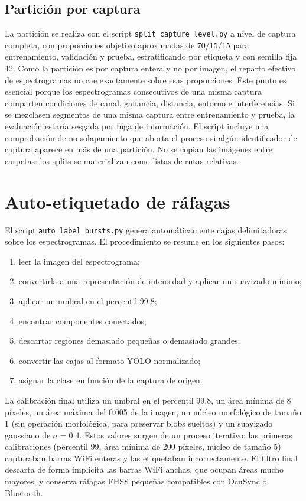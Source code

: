 \subsection{Partición por captura}

La partición se realiza con el script \texttt{split\_capture\_level.py} a nivel de captura completa, con proporciones objetivo aproximadas de \num{70}/\num{15}/\num{15} para entrenamiento, validación y prueba, estratificando por etiqueta y con semilla fija \num{42}. Como la partición es por captura entera y no por imagen, el reparto efectivo de espectrogramas no cae exactamente sobre esas proporciones. Este punto es esencial porque los espectrogramas consecutivos de una misma captura comparten condiciones de canal, ganancia, distancia, entorno e interferencias. Si se mezclasen segmentos de una misma captura entre entrenamiento y prueba, la evaluación estaría sesgada por fuga de información. El script incluye una comprobación de no solapamiento que aborta el proceso si algún identificador de captura aparece en más de una partición. No se copian las imágenes entre carpetas: los splits se materializan como listas de rutas relativas.

\section{Auto-etiquetado de ráfagas}
\label{sec:autoetiquetado}

El script \texttt{auto\_label\_bursts.py} genera automáticamente cajas delimitadoras sobre los espectrogramas. El procedimiento se resume en los siguientes pasos:

\begin{enumerate}
  \item leer la imagen del espectrograma;
  \item convertirla a una representación de intensidad y aplicar un suavizado mínimo;
  \item aplicar un umbral en el percentil \num{99.8};
  \item encontrar componentes conectados;
  \item descartar regiones demasiado pequeñas o demasiado grandes;
  \item convertir las cajas al formato YOLO normalizado;
  \item asignar la clase en función de la captura de origen.
\end{enumerate}

La calibración final utiliza un umbral en el percentil \num{99.8}, un área mínima de \num{8} píxeles, un área máxima del \num{0.005} de la imagen, un núcleo morfológico de tamaño \num{1} (sin operación morfológica, para preservar blobs sueltos) y un suavizado gaussiano de $\sigma = \num{0.4}$. Estos valores surgen de un proceso iterativo: las primeras calibraciones (percentil \num{99}, área mínima de \num{200} píxeles, núcleo de tamaño \num{5}) capturaban barras WiFi enteras y las etiquetaban incorrectamente. El filtro final descarta de forma implícita las barras WiFi anchas, que ocupan áreas mucho mayores, y conserva ráfagas FHSS pequeñas compatibles con OcuSync o Bluetooth.

